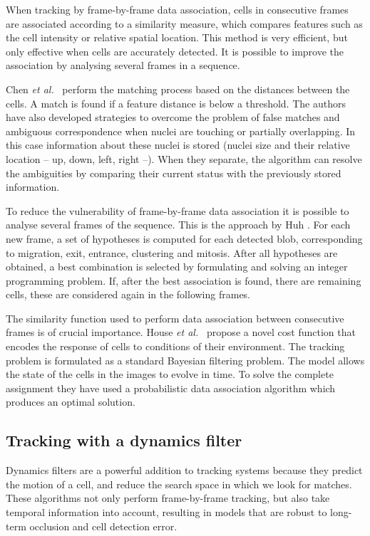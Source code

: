 When tracking by frame-by-frame data association, cells in consecutive frames are associated according to a similarity measure, which compares features such as the cell intensity or relative spatial location. This method is very efficient, but only effective when cells are accurately detected. It is possible to improve the association by analysing several frames in a sequence.

Chen \emph{et al.}~\cite{chen06} perform the matching process based on the distances between the cells. A match is found if a feature distance is below a threshold. The authors have also developed strategies to overcome the problem of false matches and ambiguous correspondence when nuclei are touching or partially overlapping. In this case information about these nuclei is stored (nuclei size and their relative location -- up, down, left, right --). When they separate, the algorithm can resolve the ambiguities by comparing their current status with the previously stored information.

To reduce the vulnerability of frame-by-frame data association it is possible to analyse several frames of the sequence. This is the approach by Huh \cite{huh13}. For each new frame, a set of hypotheses is computed for each detected blob, corresponding to migration, exit, entrance, clustering and mitosis. After all hypotheses are obtained, a best combination is selected by formulating and solving an integer programming problem. If, after the best association is found, there are remaining cells, these are considered again in the following frames.

The similarity function used to perform data association between consecutive frames is of crucial importance. House \emph{et al.}~\cite{house09} propose a novel cost function that encodes the response of cells to conditions of their environment. The tracking problem is formulated as a standard Bayesian filtering problem. The model allows the state of the cells in the images to evolve in time. To solve the complete assignment they have used a probabilistic data association algorithm which produces an optimal solution.

\subsection{Tracking with a dynamics filter}
Dynamics filters are a powerful addition to tracking systems because they predict the motion of a cell, and reduce the search space in which we look for matches. These algorithms not only perform frame-by-frame tracking, but also take temporal information into account, resulting in models that are robust to long-term occlusion and cell detection error.

